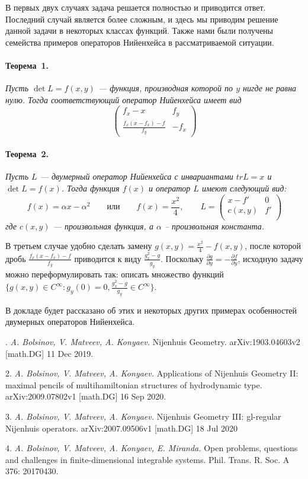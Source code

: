 В первых двух случаях задача решается полностью и приводится ответ.
Последний случай является более сложным, и здесь мы приводим решение данной задачи в некоторых классах функций.
Также нами были получены семейства примеров операторов Нийенхейса в рассматриваемой ситуации.

\paragraph{Теорема~1.}
{\it
Пусть $\det L = f(x,y)$ --- функция, производная которой по $y$ нигде не равна нулю. Тогда соответствующий оператор Нийенхейса имеет вид
\begin{equation*}
\begin{pmatrix}
f_x - x & f_y \\
\frac{f_x(x - f_x) - f}{f_y} & -f_x
\end{pmatrix}
\end{equation*}
}

\paragraph{Теорема~2.}
{\it
Пусть $L$ --- двумерный оператор Нийенхейса с инвариантами $tr L = x$ и $\det L = f(x)$. Тогда функция $f(x)$ и оператор $L$ имеют следующий вид:
$$
f(x) = \alpha x - \alpha^2
\qquad
\text{или}
\qquad
f(x) = \frac{x^2}{4},
\qquad
L =
\begin{pmatrix}
x - f' & 0 \\
c(x,y) & f' \\
\end{pmatrix}
$$
где $c(x,y)$ --- произвольная функция, а $\alpha$ -- произвольная константа.
}

В третьем случае удобно сделать замену $g(x,y) = \frac{x^2}{4} - f(x,y)$, после которой дробь $\frac{f_x(x - f_x) - f}{f_y}$ приводится
к виду $\frac{g^2_x - g}{g_y}$. Поскольку $\frac{\partial g}{\partial y} = - \frac{\partial f}{\partial y}$, исходную задачу можно переформулировать так:
описать множество функций $\lbrace g(x,y) \in C^{\infty} : g_y(0) = 0, \frac{g^2_x - g}{g_y} \in C^{\infty} \rbrace$.

В докладе будет рассказано об этих и некоторых других примерах особенностей двумерных операторов Нийенхейса.

. {\it A. Bolsinov, V. Matveev, A. Konyaev.} Nijenhuis Geometry. arXiv:1903.04603v2 [math.DG] 11 Dec 2019.

2. {\it A. Bolsinov, V. Matveev, A. Konyaev.} Applications of Nijenhuis Geometry II: maximal pencils of multihamiltonian structures of hydrodynamic type. arXiv:2009.07802v1 [math.DG] 16 Sep 2020.

3. {\it A. Bolsinov, V. Matveev, A. Konyaev.} Nijenhuis Geometry III: gl-regular Nijenhuis operators. arXiv:2007.09506v1 [math.DG] 18 Jul 2020

4. {\it A. Bolsinov, V. Matveev, A. Konyaev, E. Miranda.} Open problems, questions and challenges in finite-dimensional integrable systems. Phil. Trans. R. Soc. A 376: 20170430.
